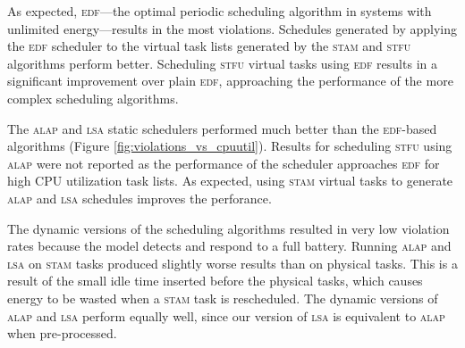 
As expected, \textsc{edf}---the optimal periodic scheduling algorithm in systems with unlimited energy---results in the most violations.  Schedules generated by applying the \textsc{edf} scheduler to the virtual task lists generated by the \textsc{stam} and \textsc{stfu} algorithms perform better.  Scheduling \textsc{stfu} virtual tasks using \textsc{edf} results in a significant improvement over plain \textsc{edf}, approaching the performance of the more complex scheduling algorithms.



The \textsc{alap} and \textsc{lsa} static schedulers performed much better than the \textsc{edf}-based algorithms
(Figure \ref{fig:violations_vs_cpuutil}).
Results for scheduling \textsc{stfu} using \textsc{alap} were not reported as the performance of the scheduler 
approaches \textsc{edf} for high CPU utilization task lists.  
As expected, using \textsc{stam} virtual tasks to generate \textsc{alap} and \textsc{lsa} schedules improves the perforance.  

The dynamic versions of the scheduling algorithms resulted in very low violation rates because the model detects 
and respond to a full battery.  Running \textsc{alap} and \textsc{lsa} on \textsc{stam} tasks produced slightly worse 
results than on physical tasks.  This is a result of the small idle time inserted before the physical tasks, 
which causes energy to be wasted when a \textsc{stam} task is rescheduled.
The dynamic versions of \textsc{alap} and \textsc{lsa} perform equally well, since our version of \textsc{lsa} is equivalent to \textsc{alap} when pre-processed. %

